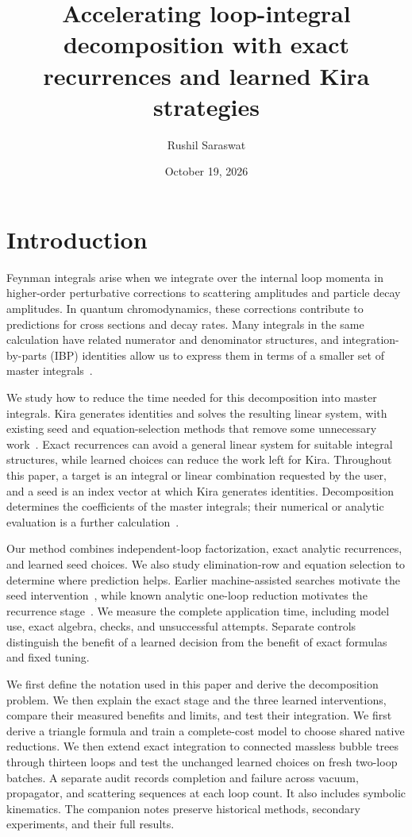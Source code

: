 \documentclass[11pt,a4paper]{article}
\title{Accelerating loop-integral decomposition with exact recurrences and learned Kira strategies}
\author{Rushil Saraswat}
\date{October 19, 2026}
\begin{document}
\maketitle


\section{Introduction}
Feynman integrals arise when we integrate over the internal loop momenta in higher-order perturbative corrections to scattering amplitudes and particle decay amplitudes. In quantum chromodynamics, these corrections contribute to predictions for cross sections and decay rates. Many integrals in the same calculation have related numerator and denominator structures, and integration-by-parts (IBP) identities allow us to express them in terms of a smaller set of master integrals~\cite{Weinzierl2022,ChetyrkinTkachov}.

We study how to reduce the time needed for this decomposition into master integrals. Kira generates identities and solves the resulting linear system, with existing seed and equation-selection methods that remove some unnecessary work~\cite{KiraOriginal,Laporta,Kira3}. Exact recurrences can avoid a general linear system for suitable integral structures, while learned choices can reduce the work left for Kira. Throughout this paper, a target is an integral or linear combination requested by the user, and a seed is an index vector at which Kira generates identities. Decomposition determines the coefficients of the master integrals; their numerical or analytic evaluation is a further calculation~\cite{Weinzierl2022}.

Our method combines independent-loop factorization, exact analytic recurrences, and learned seed choices. We also study elimination-row and equation selection to determine where prediction helps. Earlier machine-assisted searches motivate the seed intervention~\cite{Song2025,TubeSeeding2026}, while known analytic one-loop reduction motivates the recurrence stage~\cite{Hu2025}. We measure the complete application time, including model use, exact algebra, checks, and unsuccessful attempts. Separate controls distinguish the benefit of a learned decision from the benefit of exact formulas and fixed tuning.

We first define the notation used in this paper and derive the decomposition problem. We then explain the exact stage and the three learned interventions, compare their measured benefits and limits, and test their integration. We first derive a triangle formula and train a complete-cost model to choose shared native reductions. We then extend exact integration to connected massless bubble trees through thirteen loops and test the unchanged learned choices on fresh two-loop batches. A separate audit records completion and failure across vacuum, propagator, and scattering sequences at each loop count. It also includes symbolic kinematics. The companion notes preserve historical methods, secondary experiments, and their full results.
\end{document}
